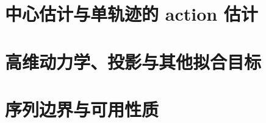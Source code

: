 \section{中心估计与单轨迹的 action 估计}
\label{sec:power-estimators}
\label{sec:center-extensions}




\section{高维动力学、投影与其他拟合目标}
\label{sec:power-projection}






\section{序列边界与可用性质}
\label{sec:power-scope}


